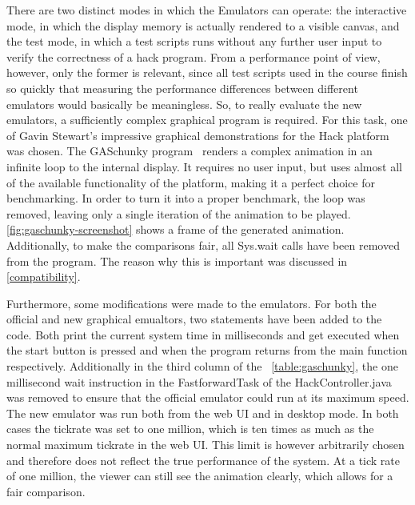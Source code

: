 There are two distinct modes in which the Emulators can operate: the interactive mode, in which the display memory is actually rendered to a visible canvas, and the test mode, in which a test scripts runs without any further user input to verify the correctness of a hack program.
From a performance point of view, however, only the former is relevant, since all test scripts used in the course finish so quickly that measuring the performance differences between different emulators would basically be meaningless.
So, to really evaluate the new emulators, a sufficiently complex graphical program is required. For this task, one of Gavin Stewart's impressive graphical demonstrations for the Hack platform was chosen.
The GASchunky program~\cite{demos} renders a complex animation in an infinite loop to the internal display. It requires no user input, but uses almost all of the available functionality of the platform, making it a perfect choice for benchmarking. In order to turn it into a proper benchmark, the loop was removed, leaving only a single iteration of the animation to be played.
\cref{fig:gaschunky-screenshot} shows a frame of the generated animation.
Additionally, to make the comparisons fair, all Sys.wait calls have been removed from the program. The reason why this is important was discussed in \cref{compatibility}.

Furthermore, some modifications were made to the emulators. For both the official and new graphical emualtors, two statements have been added to the code. Both print the current system time in milliseconds and get executed when the start button is pressed and when the program returns from the main function respectively. Additionally in the third column of the ~\cref{table:gaschunky}, the one millisecond wait instruction in the FastforwardTask of the HackController.java was removed to ensure that the official emulator could run at its maximum speed.
The new emulator was run both from the web UI and in desktop mode. In both cases the tickrate was set to one million, which is ten times as much as the normal maximum tickrate in the web UI. This limit is however arbitrarily chosen and therefore does not reflect the true performance of the system. At a tick rate of one million, the viewer can still see the animation clearly, which allows for a fair comparison.



